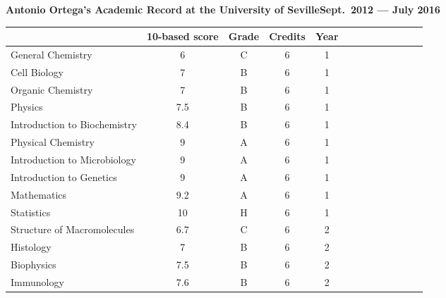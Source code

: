 \documentclass[12pt, oneside]{memoir}
\newcommand{\myrowcolour}{\rowcolor[gray]{0.925}}
\newcommand{\cheading}[2]{\textbf{#1\hfill #2}}
\newcommand{\cheading}[2]{\textcolor{Maroon}{\textbf{#1\hfill #2}}}
\begin{document}
\thispagestyle{empty}
\parindent0pt
%

\cheading{Antonio Ortega's Academic Record at the University of Seville}{Sept.\ 2012 --- July 2016}

\begin{footnotesize}
\begin{longtable}{@{}l cc cc cc cc cc cc}

\toprule%
 \centering%
 & \multicolumn{1}{c}{{{\bfseries 10-based score}}}
 & \multicolumn{1}{c}{{{\bfseries Grade}}}
 & \multicolumn{1}{c}{{{\bfseries Credits}}}
 & \multicolumn{1}{c}{{{\bfseries Year}}} \\

\cmidrule[0.4pt](r{0.125em}){1-1}%
\cmidrule[0.4pt](lr{0.125em}){2-2}%
\cmidrule[0.4pt](lr{0.125em}){3-3}%
\cmidrule[0.4pt](lr{0.125em}){4-4}%
\cmidrule[0.4pt](l{0.25em}){5-5}%

\endhead
    \myrowcolour%
    General Chemistry              & 6   & C & 6 & 1 \\ 
    Cell Biology                   & 7   & B & 6 & 1 \\
    
    \myrowcolour%
    Organic Chemistry              & 7   & B & 6 & 1 \\
    Physics                        & 7.5 & B & 6 & 1 \\
    
    \myrowcolour%
    Introduction to Biochemistry   & 8.4 & B & 6 & 1 \\            
    Physical Chemistry             & 9   & A & 6 & 1 \\    

    \myrowcolour%
    Introduction to Microbiology   & 9   & A & 6 & 1 \\    
    Introduction to Genetics       & 9   & A & 6 & 1 \\    

    \myrowcolour%
    Mathematics                    & 9.2 & A & 6 & 1 \\    
    Statistics                     & 10  & H & 6 & 1 \\        

    \myrowcolour%
    Structure of Macromolecules    & 6.7   & C & 6 & 2 \\        
    Histology                      & 7   & B & 6 & 2 \\        

    \myrowcolour%
    Biophysics                     & 7.5   & B & 6 & 2 \\        
    Immunology                     & 7.6   & B & 6 & 2 \\        


\end{longtable}
\end{footnotesize}
\end{document}
